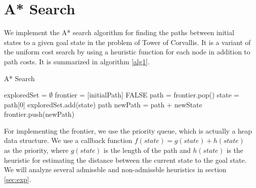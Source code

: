 \section{A* Search}\label{sec:astar}

We implement the A* search algorithm for finding the paths between initial states to a given goal state in the problem of Tower of Corvallis. It is a variant of the uniform cost search by using a heuristic function for each node in addition to path costs. It is summarized in algorithm \ref{alg1}.

\begin{algorithm}[H]
\caption{A* Search}
\label{alg1}
\begin{algorithmic}
\STATE exploredSet = $\emptyset$ 
\STATE frontier = [initialPath]
    \RETURN FALSE
\ENDIF
\STATE path = frontier.pop()
\STATE state = path[0]
\STATE exploredSet.add(state)
    \RETURN path
\ENDIF
{}
        \STATE newPath = path + newState
            \STATE frontier.push(newPath)
        \ENDIF
    \ENDFOR
\ENDFOR
\ENDWHILE
\end{algorithmic}
\end{algorithm}

For implementing the frontier, we use the priority queue, which is actually a heap data structure. We use a callback function $f(state) = g(state) + h(state)$ as the priority, where $g(state)$ is the length of the path and $h(state)$ is the heuristic for estimating the distance between the current state to the goal state. We will analyze several admissble and non-admissble heuristics in section \ref{sec:exp}.

